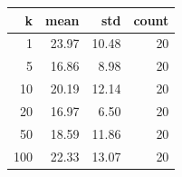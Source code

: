\begin{tabular}{rrrr}
\toprule
k & mean & std & count \\
\midrule
1 & 23.97 & 10.48 & 20 \\
5 & 16.86 & 8.98 & 20 \\
10 & 20.19 & 12.14 & 20 \\
20 & 16.97 & 6.50 & 20 \\
50 & 18.59 & 11.86 & 20 \\
100 & 22.33 & 13.07 & 20 \\
\bottomrule
\end{tabular}
